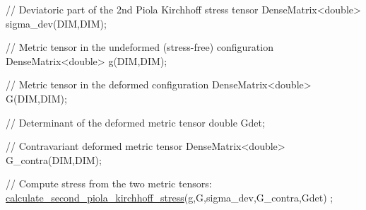 \begin{DoxyEnumerate}
\begin{DoxyCode}
\textcolor{comment}{// Deviatoric part of the 2nd Piola Kirchhoff stress tensor}
DenseMatrix<double> sigma\_dev(DIM,DIM);

\textcolor{comment}{// Metric tensor in the undeformed (stress-free) configuration}
DenseMatrix<double> g(DIM,DIM);

\textcolor{comment}{// Metric tensor in the deformed  configuration}
DenseMatrix<double> G(DIM,DIM);

\textcolor{comment}{// Determinant of the deformed metric tensor}
\textcolor{keywordtype}{double} Gdet;

\textcolor{comment}{// Contravariant deformed metric tensor}
DenseMatrix<double> G\_contra(DIM,DIM);

\textcolor{comment}{// Compute stress from the two metric tensors:}
\hyperlink{classoomph_1_1ConstitutiveLaw_a93527d910de908035feb8f41b0401065}{calculate\_second\_piola\_kirchhoff\_stress}(g,G,sigma\_dev,G\_contra,Gdet)
      ;
\end{DoxyCode}
 ~\newline
 ~\newline
 ~\newline


\end{DoxyEnumerate}
